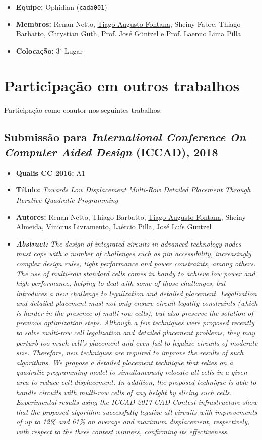 \begin{itemize}
\item \textbf{Equipe:} Ophidian (\texttt{cada001})
\item \textbf{Membros:} Renan Netto, \underline{Tiago Augusto Fontana}, Sheiny Fabre, Thiago Barbatto, Chrystian Guth, Prof. José Güntzel e Prof. Laercio Lima Pilla
\item \textbf{Colocação:} $3^{\circ}$ Lugar
\end{itemize}


\section{Participação em outros trabalhos}

Participação como coautor nos seguintes trabalhos:

\subsection{Submissão para \textit{International Conference On Computer Aided Design} (ICCAD), 2018}

\begin{itemize}
    \item \textbf{Qualis CC 2016:} A1
    \item \textbf{Título:} \textit{Towards Low Displacement Multi-Row Detailed Placement Through Iterative Quadratic Programming}
    \item \textbf{Autores:}  Renan Netto, Thiago Barbatto, \underline{Tiago Augusto Fontana}, Sheiny Almeida, Vinicius Livramento, Laércio Pilla, José Luís Güntzel
    \item \textbf{\textit{Abstract:}} \emph{The design of integrated circuits in advanced technology nodes must cope with a number of challenges such as pin accessibility, increasingly complex design rules, tight performance and power constraints, among others. The use of multi-row standard cells comes in handy to achieve low power and high performance, helping to deal with some of those challenges, but introduces a new challenge to legalization and detailed placement. Legalization and detailed placement must not only ensure circuit legality constraints (which is harder in the presence of multi-row cells), but also preserve the solution of previous optimization steps. Although a few techniques were proposed recently to solve multi-row cell legalization and detailed placement problems, they may perturb too much cell's placement and even fail to legalize circuits of moderate size. Therefore, new techniques are required to improve the results of such algorithms. We propose a detailed placement technique that relies on a quadratic programming model to simultaneously relocate all cells in a given area to reduce cell displacement. In addition, the proposed technique is able to handle circuits with multi-row cells of any height by slicing such cells. Experimental results using the ICCAD 2017 CAD Contest infrastructure show that the proposed algorithm successfully legalize all circuits with improvements of up to 12\% and 61\% on average and maximum displacement, respectively, with respect to the three contest winners, confirming its effectiveness.}
\end{itemize}

